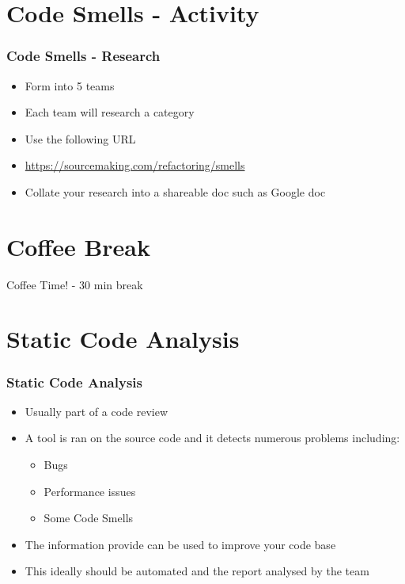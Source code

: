 \section{Code Smells - Activity}

\begin{frame}
	\frametitle{Code Smells - Research}
	\begin{itemize}
		\item Form into 5 teams
		\item Each team will research a category
		\item Use the following URL
		\item \url{https://sourcemaking.com/refactoring/smells}
		\item Collate your research into a shareable doc such as Google doc
	\end{itemize}
\end{frame}

\section{Coffee Break}
\begin{frame}
	\begin{center}
		Coffee Time! - 30 min break
	\end{center}
\end{frame}

\section{Static Code Analysis}

\begin{frame}
	\frametitle{Static Code Analysis}
	\begin{itemize}
		\item Usually part of a code review
		\item A tool is ran on the source code and it detects numerous problems including:
		\begin{itemize}
			\item Bugs
			\item Performance issues
			\item Some Code Smells
		\end{itemize}
		\item The information provide can be used to improve your code base
		\item This ideally should be automated and the report analysed by the team
	\end{itemize}
\end{frame}

